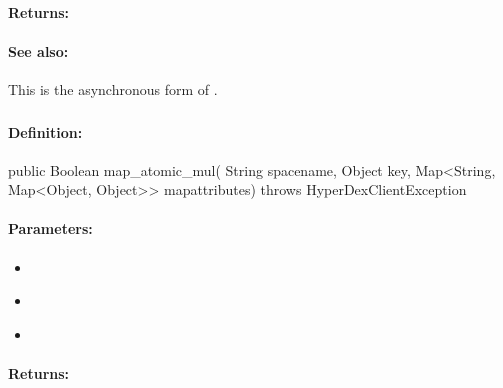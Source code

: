 \paragraph{Returns:}


\paragraph{See also:}  This is the asynchronous form of .

\pagebreak
\subsubsection{}
\label{api:java:map_atomic_mul}


\paragraph{Definition:}
\begin{javacode}
public Boolean map_atomic_mul(
        String spacename,
        Object key,
        Map<String, Map<Object, Object>> mapattributes) throws HyperDexClientException
\end{javacode}

\paragraph{Parameters:}
\begin{itemize}[noitemsep]
\item {}\\

\item {}\\

\item {}\\

\end{itemize}

\paragraph{Returns:}


